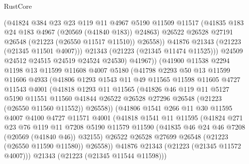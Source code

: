 \begin{lexlean}{RustCore}
\begin{coremodule}
                  (@41824
                    @384
                    @23
                    @23
                    @119
                    @11
                    @4967
                    @5190
                    @11509
                    @11517
                    (@41835 @183 @24 @183 @4967 (@20569 (@41840 @183)) @24863)
                    @26522
                    @26528
                    @27191
                    @26548
                    (@21223 (@26550 @11517 @11510))
                    @26558))
                @41876
                @21343
                (@21223 (@21345 @11501 @4007)))
              @21343
              (@21223 (@21345 @11474 @11525)))
            @24509
            @24512
            @24515
            @24519
            @24524
            @24530)
          @41967))
      (@41900
        @11538
        @2294
        @1198
        @13
        @11599
        @11608
        @4007
        @5180
        (@41798
          @2293
          @50
          @13
          @11599
          @11606
          @4933
          (@41806
            @1293
            @1543
            @11
            @49
            @11565
            @11598
            @11605
            @4727
            @11543
            @4001
            (@41818
              @1293
              @11
              @11565
              (@41826
                @46
                @119
                @11
                @5127
                @5190
                @11551
                @11560
                @41844
                @26522
                @26528
                @27296
                @26548
                (@21223 (@26550 @11560 @11552))
                @26558))
            (@41806
              @1541
              @266
              @11
              @30
              @11595
              @4007
              @4100
              @4727
              @11571
              @4001
              (@41818
                @1541
                @11
                @11595
                (@41824
                  @271
                  @23
                  @76
                  @119
                  @11
                  @7208
                  @5190
                  @11579
                  @11590
                  (@41835 @46 @24 @46 @7208 (@20569 (@41840 @46)) @32155)
                  @26522
                  @26528
                  @27699
                  @26548
                  (@21223 (@26550 @11590 @11580))
                  @26558))
              @41876
              @21343
              (@21223 (@21345 @11572 @4007)))
            @21343
            (@21223 (@21345 @11544 @11598)))

\end{coremodule}
\end{lexlean}
